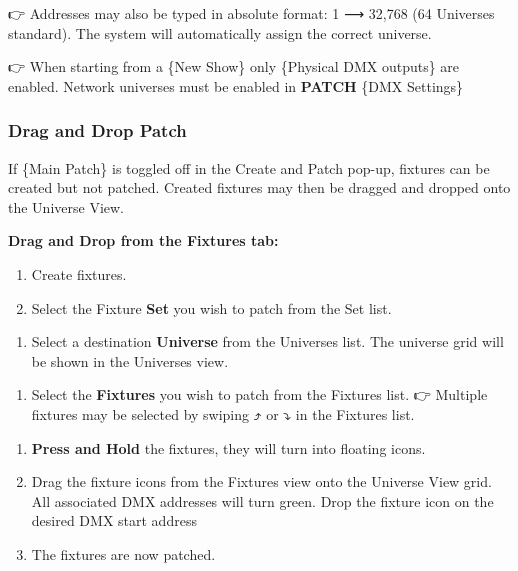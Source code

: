 \documentclass[
]{article}
\providecommand{\tightlist}{%
  \setlength{\itemsep}{0pt}\setlength{\parskip}{0pt}}
\begin{document}
👉 Addresses may also be typed in absolute format: 1 ⟶ 32,768 (64 Universes standard). The system will automatically assign the correct universe.

👉 When starting from a \{New Show\} only \{Physical DMX outputs\} are enabled. Network universes must be enabled in \textbf{PATCH} \{DMX Settings\}

\hypertarget{drag-and-drop-patch}{%
\subsubsection{Drag and Drop Patch}\label{drag-and-drop-patch}}

If \{Main Patch\} is toggled off in the Create and Patch pop-up, fixtures can be created but not patched. Created fixtures may then be dragged and dropped onto the Universe View.

\textbf{Drag and Drop from the Fixtures tab:}

\begin{enumerate}
\def\labelenumi{\arabic{enumi}.}
\item
  Create fixtures.
\item
  Select the Fixture \textbf{Set} you wish to patch from the Set list.
\end{enumerate}

\begin{enumerate}
\def\labelenumi{\arabic{enumi}.}
\setcounter{enumi}{2}
\tightlist
\item
  Select a destination \textbf{Universe} from the Universes list. The universe grid will be shown in the Universes view.
\end{enumerate}

\begin{enumerate}
\def\labelenumi{\arabic{enumi}.}
\setcounter{enumi}{3}
\tightlist
\item
  Select the \textbf{Fixtures} you wish to patch from the Fixtures list.
  👉 Multiple fixtures may be selected by swiping ⤴ or ⤵ in the Fixtures list.
\end{enumerate}

\begin{enumerate}
\def\labelenumi{\arabic{enumi}.}
\setcounter{enumi}{4}
\item
  \textbf{Press and Hold} the fixtures, they will turn into floating icons.
\item
  Drag the fixture icons from the Fixtures view onto the Universe View grid. All associated DMX addresses will turn green. Drop the fixture icon on the desired DMX start address
\item
  The fixtures are now patched.
\end{enumerate}
\end{document}
